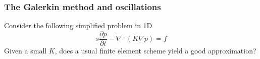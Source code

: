 \begin{frame}
\frametitle{The Galerkin method and oscillations}
Consider the following simplified problem in 1D 
\[
s \frac{\partial p}{\partial t} - \nabla \cdot (K \nabla p) = f 
\]
Given a small $K$, does a usual finite element scheme yield a good approximation? 
\end{frame}
